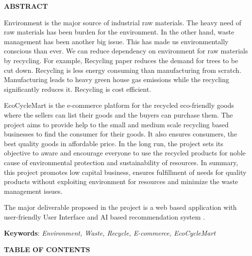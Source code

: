 \documentclass[12pt, a4paper, oneside]{article}
\begin{document}
\large
\begin{center}
	\textbf{ABSTRACT}
\end{center}

\normalsize
Environment is the major source of industrial raw materials. The heavy need of raw materials has been burden for the environment. In the other hand, waste management has been another big issue. This has made us environmentally conscious than ever. We can reduce dependency on environment for raw materials by recycling. For example, Recycling paper reduces the demand for trees to be cut down. Recycling is less energy consuming than manufacturing from scratch. Manufacturing leads to heavy green house gas emissions while the recycling significantly reduces it. Recycling is cost efficient.

EcoCycleMart is the e-commerce platform for the recycled eco-friendly goods where the sellers can list their goods and the buyers can purchase them. The project aims to provide help to the small and medium scale recycling based businesses to find the consumer for their goods. It also ensures consumers, the best quality goods in affordable price. In the long run, the project sets its objective to aware and encourage everyone to use the recycled products for noble cause of environmental protection and sustainability of resources. In summary, this project promotes low capital business, ensures fulfillment of needs for quality products without exploiting environment for resources and minimize the waste management issues.

The major deliverable proposed in the project is a web based application with
user-friendly User Interface and AI based recommendation system .

\textbf{Keywords}: \textit{Environment, Waste, Recycle, E-commerce, EcoCycleMart}\\

\break

\large
{}
\begin{center}
	\textbf{TABLE OF CONTENTS}
\end{center}


\normalsize
\setlength{\cftbeforetoctitleskip}{0pt}
\renewcommand{\contentsname}{}
\tableofcontents

\break
\listoffigures %

\break
\listoftables %
\end{document}
